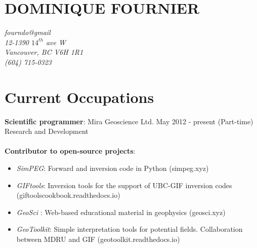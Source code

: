 \documentclass[10pt,a4paper]{article}
\begin{document}
  



\section*{DOMINIQUE FOURNIER}

\emph{ fourndo@gmail \\12-1390 $14^{th}$ ave W \\   Vancouver, BC V6H 1R1 \\  (604) 715-0323}
                           
                                           
 
\section{Current Occupations} 
\textbf{Scientific programmer}: Mira Geoscience Ltd.  May 2012 - present (Part-time)\\
Research and Development\\ \\
\textbf{Contributor to open-source projects}:
\begin{itemize}
	  \item \emph{SimPEG}: Forward and inversion code in Python (simpeg.xyz)
        \item \emph{GIFtools}: Inversion tools for the support of UBC-GIF inversion codes (giftoolscookbook.readthedocs.io)
        \item \emph{GeoSci} : Web-based educational material in geophysics (geosci.xyz)
        \item \emph{GeoToolkit}: Simple interpretation tools for potential fields. Collaboration between MDRU and GIF (geotoolkit.readthedocs.io)
        \end{itemize}
\end{document}
